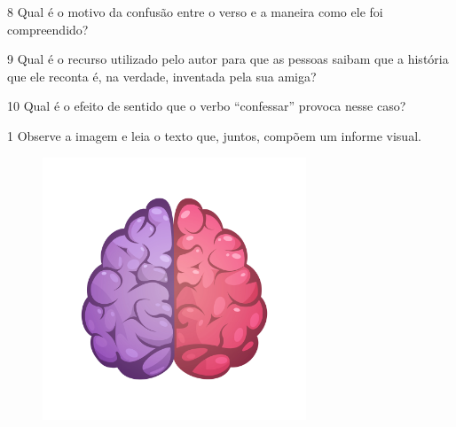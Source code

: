 \num{8} Qual é o motivo da confusão entre o verso e a maneira como ele
foi compreendido?



\num{9} Qual é o recurso utilizado pelo autor para que as pessoas saibam
que a história que ele reconta é, na verdade, inventada pela sua amiga?



\num{10} Qual é o efeito de sentido que o verbo ``confessar'' provoca
nesse caso?




\num{1} Observe a imagem e leia o texto que, juntos, compõem um informe
visual.

\begin{figure}
\includegraphics[width=0.7\textwidth]{./imgSAEB_6_POR/freepik/PORT_6_IMG-19.jpeg}
\end{figure}


